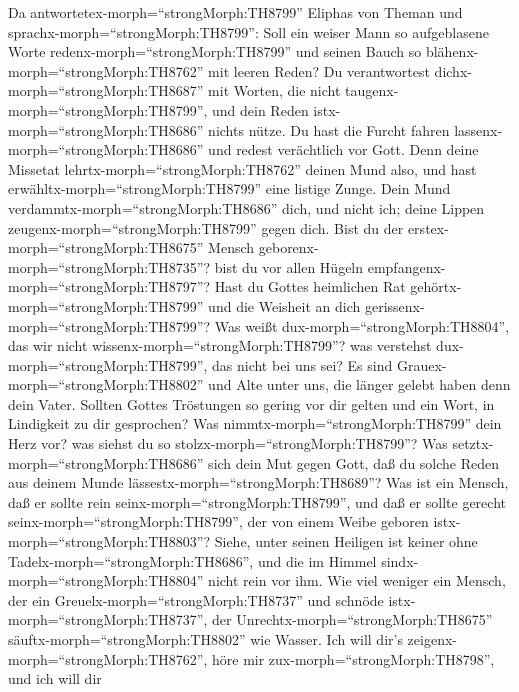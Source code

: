  Da antwortetex-morph=``strongMorph:TH8799'' Eliphas von
Theman und sprachx-morph=``strongMorph:TH8799'':  Soll ein
weiser Mann so aufgeblasene Worte redenx-morph=``strongMorph:TH8799''
und seinen Bauch so blähenx-morph=``strongMorph:TH8762'' mit leeren
Reden?  Du verantwortest dichx-morph=``strongMorph:TH8687''
mit Worten, die nicht taugenx-morph=``strongMorph:TH8799'', und dein
Reden istx-morph=``strongMorph:TH8686'' nichts nütze.  Du
hast die Furcht fahren lassenx-morph=``strongMorph:TH8686'' und redest
verächtlich vor Gott.  Denn deine Missetat
lehrtx-morph=``strongMorph:TH8762'' deinen Mund also, und hast
erwähltx-morph=``strongMorph:TH8799'' eine listige Zunge. 
Dein Mund verdammtx-morph=``strongMorph:TH8686'' dich, und nicht ich;
deine Lippen zeugenx-morph=``strongMorph:TH8799'' gegen dich.
 Bist du der erstex-morph=``strongMorph:TH8675'' Mensch
geborenx-morph=``strongMorph:TH8735''? bist du vor allen Hügeln
empfangenx-morph=``strongMorph:TH8797''?  Hast du Gottes
heimlichen Rat gehörtx-morph=``strongMorph:TH8799'' und die Weisheit an
dich gerissenx-morph=``strongMorph:TH8799''?  Was weißt
dux-morph=``strongMorph:TH8804'', das wir nicht
wissenx-morph=``strongMorph:TH8799''? was verstehst
dux-morph=``strongMorph:TH8799'', das nicht bei uns sei? 
Es sind Grauex-morph=``strongMorph:TH8802'' und Alte unter uns, die
länger gelebt haben denn dein Vater.  Sollten Gottes
Tröstungen so gering vor dir gelten und ein Wort, in Lindigkeit zu dir
gesprochen?  Was nimmtx-morph=``strongMorph:TH8799'' dein
Herz vor? was siehst du so stolzx-morph=``strongMorph:TH8799''?
 Was setztx-morph=``strongMorph:TH8686'' sich dein Mut
gegen Gott, daß du solche Reden aus deinem Munde
lässestx-morph=``strongMorph:TH8689''?  Was ist ein Mensch,
daß er sollte rein seinx-morph=``strongMorph:TH8799'', und daß er sollte
gerecht seinx-morph=``strongMorph:TH8799'', der von einem Weibe geboren
istx-morph=``strongMorph:TH8803''?  Siehe, unter seinen
Heiligen ist keiner ohne Tadelx-morph=``strongMorph:TH8686'', und die im
Himmel sindx-morph=``strongMorph:TH8804'' nicht rein vor ihm.
 Wie viel weniger ein Mensch, der ein
Greuelx-morph=``strongMorph:TH8737'' und schnöde
istx-morph=``strongMorph:TH8737'', der
Unrechtx-morph=``strongMorph:TH8675''
säuftx-morph=``strongMorph:TH8802'' wie Wasser.  Ich will
dir's zeigenx-morph=``strongMorph:TH8762'', höre mir
zux-morph=``strongMorph:TH8798'', und ich will dir
